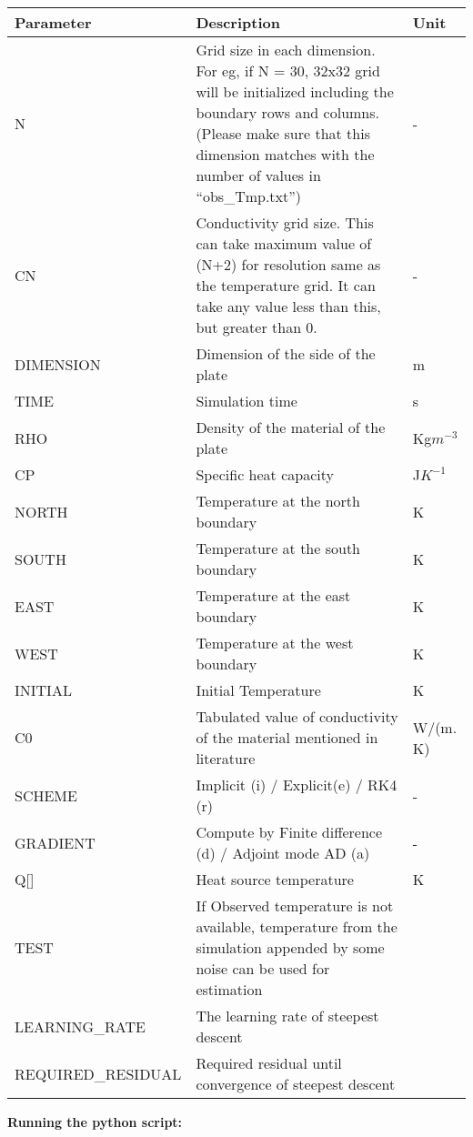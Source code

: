 \documentclass[10pt,a4paper]{report}
\begin{document}
\begin{appendices}
\begin{tabular}{ | m{10.5em} | m{7cm}| m{0.95cm} | } 
\hline
\textbf{Parameter} & \textbf{Description} & \textbf{Unit}\\ 
\hline
N& Grid size in each dimension. For eg, if N = 30, 32x32 grid will be initialized including the boundary rows and columns. (Please make sure that this dimension matches with the number of values in “obs\_Tmp.txt”) & - \\ 
\hline
CN & Conductivity grid size. This can take maximum value of (N+2) for resolution same as the temperature grid. It can take any value less than this, but greater than 0. & - \\ 
\hline
DIMENSION & Dimension of the side of the plate & m \\ 
\hline
TIME & Simulation time & s\\
\hline
RHO & Density of the material of the plate & Kg$m^{-3}$\\
\hline
CP & Specific heat capacity & J$K^{-1}$\\
\hline
NORTH & Temperature at the north boundary & K\\
\hline
SOUTH & Temperature at the south boundary & K\\
\hline
EAST & Temperature at the east boundary & K\\
\hline
WEST & Temperature at the west boundary & K\\
\hline
INITIAL & Initial Temperature & K\\
\hline
C0 & Tabulated value of conductivity of the material mentioned in literature & W/(m. K)\\
\hline
SCHEME & Implicit (i) / Explicit(e) / RK4 (r) & -\\
\hline
GRADIENT & Compute by Finite difference (d) / Adjoint mode AD (a) & -\\
\hline
Q[] & Heat source temperature & K\\
\hline
TEST & If Observed temperature is not available, temperature from the simulation appended by some noise can be used for estimation & \\
\hline
LEARNING\_RATE & The learning rate of steepest descent & \\
\hline
REQUIRED\_RESIDUAL & Required residual until convergence of steepest descent & \\
\hline

\end{tabular}


\textbf{Running the python script:}\\


\end{appendices}
\end{document}
